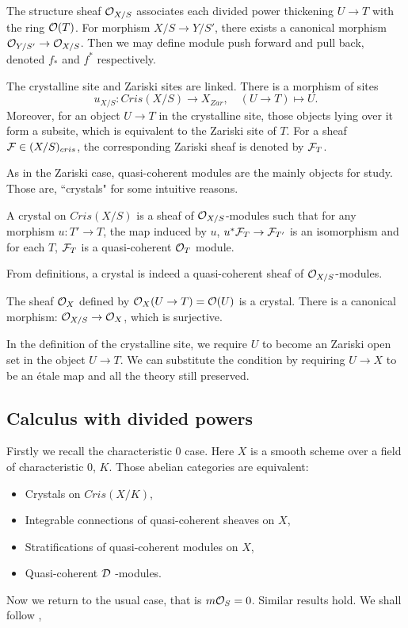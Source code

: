 The structure sheaf ${\mathcal {O}}_{X/S}$ associates 
each divided power thickening $U \to T$ with the ring ${\mathcal {O}}(T)$. 
For morphism $X/S \to Y/S'$, 
there exists a canonical morphism ${\mathcal {O}}_{Y/S'} \to {\mathcal {O}}_{X/S}$. 
Then we may define module push forward and pull back, 
denoted $f_*$ and $f^*$ respectively. 

The crystalline site and Zariski sites are linked. 
There is a morphism of sites 
\[
    u_{X/S} \colon Cris(X/S) \to X_{Zar}, \quad (U \to T) \mapsto U.
\]
Moreover, for an object $U \to T$ in the crystalline site, 
those objects lying over it form a subsite, 
which is equivalent to the Zariski site of $T$. 
For a sheaf ${\mathcal {F}} \in (X/S)_{cris}$, 
the corresponding Zariski sheaf is denoted by ${\mathcal {F}}_T$.

As in the Zariski case, 
quasi-coherent modules are the mainly objects for study. 
Those are, ``crystals" for some intuitive reasons.
\begin{definition}
    A crystal on $Cris(X/S)$ is a sheaf of ${\mathcal {O}}_{X/S}$-modules 
    such that for any morphism $u\colon T' \to T$, 
    the map induced by $u$, $u^*{\mathcal {F}}_T \to {\mathcal {F}}_{T'}$ is an isomorphism 
    and for each $T$, ${\mathcal {F}}_T$ is a quasi-coherent ${\mathcal {O}}_T$ module. 
\end{definition}

From definitions, 
a crystal is indeed a quasi-coherent sheaf of ${\mathcal {O}}_{X/S}$-modules.
\begin{example}
    The sheaf ${\mathcal {O}}_X$ defined by ${\mathcal {O}}_X(U \to T) = {\mathcal {O}}(U)$ is a crystal. 
    There is a canonical morphism: ${\mathcal {O}}_{X/S} \to {\mathcal {O}}_X$, which is surjective.
\end{example}

\begin{remark}
    In the definition of the crystalline site, 
    we require $U$ to become an Zariski open set in the object $U \to T$. 
    We can substitute the condition by requiring 
    $U \to X$ to be an \'etale map and all the theory still preserved. 
\end{remark}

\subsection{Calculus with divided powers}
Firstly we recall the characteristic $0$ case. 
Here $X$ is a smooth scheme over a field of characteristic $0$, $K$. 
Those abelian categories are equivalent:
\begin{itemize}
    \item 
        Crystals on $Cris(X/K)$,
    \item 
        Integrable connections of quasi-coherent sheaves on $X$,
    \item 
        Stratifications of quasi-coherent modules on $X$,
    \item 
        Quasi-coherent ${\mathcal {D}}$ -modules.
\end{itemize}
Now we return to the usual case, that is $m {\mathcal {O}}_S = 0$. 
Similar results hold. We shall follow \cite{Sta},

